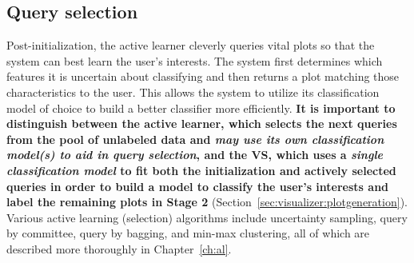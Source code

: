 \subsection{Query selection}
\label{sec:visualizer:al:tree}

Post-initialization, the active learner cleverly queries vital plots so that 
the system can best learn the user’s interests. The system first determines 
which features it is uncertain about classifying and then returns a plot 
matching those characteristics to the user. This allows the system to utilize 
its classification model of choice to build a better classifier more 
efficiently. \textbf{
	It is important to distinguish between the active learner, which 
	selects the next queries from the pool of unlabeled data and \textit{may 
		use 
		its own classification model(s) to aid in query selection}, and the VS, 
	which 
	uses a \textit{single classification model} to fit both the initialization 
	and actively selected queries in order to build a model to classify the 
	user's 
	interests and label the remaining plots in Stage 2 }
(Section~\ref{sec:visualizer:plotgeneration}). 
Various active learning (selection) algorithms include uncertainty sampling, 
query by committee, query by bagging, and min-max clustering, all of which are 
described more thoroughly in Chapter~\ref{ch:al}.